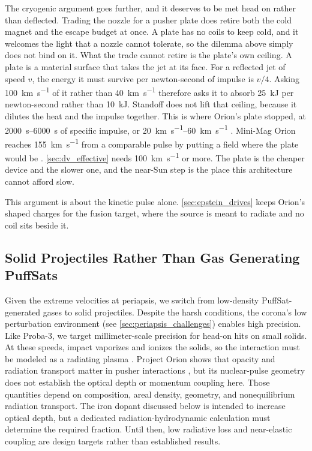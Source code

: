 \documentclass{article}
\begin{document}
The cryogenic argument goes further, and it deserves to be met head on rather than deflected. Trading the nozzle for a pusher plate does retire both the cold magnet and the escape budget at once. A plate has no coils to keep cold, and it welcomes the light that a nozzle cannot tolerate, so the dilemma above simply does not bind on it. What the trade cannot retire is the plate's own ceiling. A plate is a material surface that takes the jet at its face. For a reflected jet of speed $v$, the energy it must survive per newton-second of impulse is $v/4$. Asking \SI{100}{\kilo\meter\per\second} of it rather than \SI{40}{\kilo\meter\per\second} therefore asks it to absorb \SI{25}{\kilo\joule} per newton-second rather than \SI{10}{\kilo\joule}. Standoff does not lift that ceiling, because it dilutes the heat and the impulse together. This is where Orion's plate stopped, at \SIrange{2000}{6000}{\second} of specific impulse, or \SIrange{20}{60}{\kilo\meter\per\second} \cite{projorion}. Mini-Mag Orion reaches \SI{155}{\kilo\meter\per\second} from a comparable pulse by putting a field where the plate would be \cite{ewig2003minimag, lenard2007minimag}. \autoref{sec:dv_effective} needs \SI{100}{\kilo\meter\per\second} or more. The plate is the cheaper device and the slower one, and the near-Sun step is the place this architecture cannot afford slow.

This argument is about the kinetic pulse alone. \autoref{sec:epstein_drives} keeps Orion's shaped charges for the fusion target, where the source is meant to radiate and no coil sits beside it.

\subsection{Solid Projectiles Rather Than Gas Generating PuffSats}\label{sec:solid_PuffSats}
Given the extreme velocities at periapsis, we switch from low-density PuffSat-generated gases to solid projectiles. Despite the harsh conditions, the corona's low perturbation environment (see \autoref{sec:periapsis_challenges}) enables high precision. Like Proba-3, we target millimeter-scale precision for head-on hits on small solids. At these speeds, impact vaporizes and ionizes the solids, so the interaction must be modeled as a radiating plasma \cite{zeldovich_raizer}. Project Orion shows that opacity and radiation transport matter in pusher interactions \cite{balcomb1970nuclear}, but its nuclear-pulse geometry does not establish the optical depth or momentum coupling here. Those quantities depend on composition, areal density, geometry, and nonequilibrium radiation transport. The iron dopant discussed below is intended to increase optical depth, but a dedicated radiation-hydrodynamic calculation must determine the required fraction. Until then, low radiative loss and near-elastic coupling are design targets rather than established results.
\end{document}
